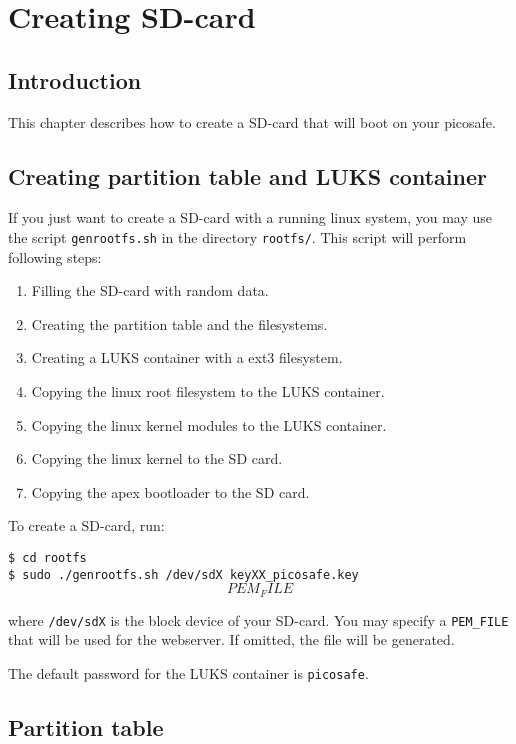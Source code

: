 \chapter{Creating SD-card}

\section{Introduction}

This chapter describes how to create a SD-card that will boot on your picosafe.

\section{Creating partition table and LUKS container}

If you just want to create a SD-card with a running linux system, you may use
the script \texttt{genrootfs.sh} in the directory \texttt{rootfs/}. This script
will perform following steps:

\begin{enumerate}
\item Filling the SD-card with random data.
\item Creating the partition table and the filesystems.
\item Creating a LUKS container with a ext3 filesystem.
\item Copying the linux root filesystem to the LUKS container.
\item Copying the linux kernel modules to the LUKS container.
\item Copying the linux kernel to the SD card.
\item Copying the apex bootloader to the SD card.
\end{enumerate}

To create a SD-card, run:

\texttt{\$ cd rootfs} \\
\texttt{\$ sudo ./genrootfs.sh /dev/sdX keyXX\_picosafe.key \[PEM_FILE\]}

where \texttt{/dev/sdX} is the block device of your SD-card. You may specify a
\texttt{PEM\_FILE} that will be used for the webserver. If omitted, the file
will be generated.

The default password for the LUKS container is \texttt{picosafe}.

\section{Partition table}

